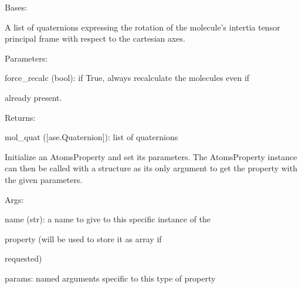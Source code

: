 \documentclass[letterpaper,10pt,english]{sphinxmanual}
\begin{document}
\begin{fulllineitems}
\label{doctree/soprano.properties.linkage.linkage:soprano.properties.linkage.linkage.MoleculeQuaternion}
Bases: {\hyperref[doctree/soprano.properties.atomsproperty:soprano.properties.atomsproperty.AtomsProperty]{}}

A list of quaternions expressing the rotation of the molecule's intertia
tensor principal frame with respect to the cartesian axes.

\begin{DUlineblock}{0em}
\item[] Parameters:
\item[]
\begin{DUlineblock}{\DUlineblockindent}
\item[] force\_recalc (bool): if True, always recalculate the molecules even if
\item[]
\begin{DUlineblock}{\DUlineblockindent}
\item[] already present.
\end{DUlineblock}
\end{DUlineblock}
\end{DUlineblock}

\begin{DUlineblock}{0em}
\item[] Returns:
\item[]
\begin{DUlineblock}{\DUlineblockindent}
\item[] mol\_quat ({[}ase.Quaternion{]}): list of quaternions
\end{DUlineblock}
\end{DUlineblock}

Initialize an AtomsProperty and set its parameters.
The AtomsProperty instance can then be called with a structure as its
only argument to get the property with the given parameters.

\begin{DUlineblock}{0em}
\item[] Args:
\item[]
\begin{DUlineblock}{\DUlineblockindent}
\item[] name (str): a name to give to this specific instance of the
\item[]
\begin{DUlineblock}{\DUlineblockindent}
\item[] property (will be used to store it as array if
\item[] requested)
\end{DUlineblock}
\item[] params: named arguments specific to this type of property
\end{DUlineblock}
\end{DUlineblock}


\end{fulllineitems}
\end{document}
